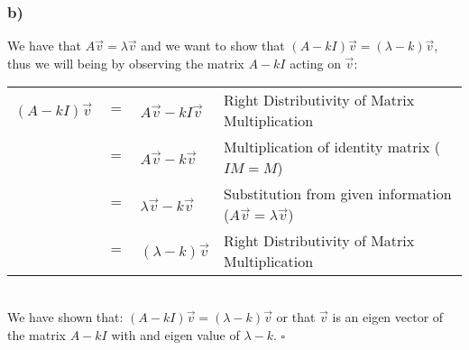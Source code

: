 \documentclass{article}
\begin{document}
\subsubsection*{b)}
We have that $A\vec{v}=\lambda \vec{v}$ and we want to show that $(A-kI)\vec{v}=(\lambda-k)\vec{v}$,  thus we will being by observing the matrix $A-kI$ acting on $\vec{v}$:
\begin{table}[htp]
\centering
\begin{tabular}{ccll}
  $(A-kI)\vec{v}$ & $=$  & $A\vec{v}-kI\vec{v}$        & Right Distributivity of Matrix Multiplication \\
                  & $=$  & $A\vec{v}-k\vec{v}$         & Multiplication of identity matrix ($IM=M$)\\
                  & $=$  & $\lambda\vec{v}-k\vec{v}$   & Substitution from given information ($A\vec{v}=\lambda\vec{v}$)  \\
                  & $=$  & $(\lambda-k)\vec{v}$        & Right Distributivity of Matrix Multiplication  \\
\end{tabular}
\end{table}\\
We have shown that: $(A-kI)\vec{v}=(\lambda-k)\vec{v}$ or that $\vec{v}$ is an eigen vector of the matrix $A-kI$ with and eigen value of $\lambda -k$. $\square$
\end{document}

